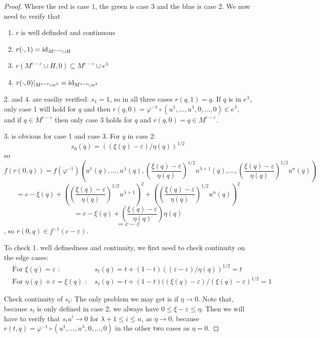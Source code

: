 \begin{proof}
   Where the red is case 1, the green is case 3 and the blue is case 2.
   We now need to verify that
   \begin{enumerate}
      \item $r$ is well definded and continuous 
      \item $r(\cdot, 1) = {\operatorname{id}}_{M^{c - \varepsilon} \cup H}$
      \item $r(M^{c - \varepsilon} \cup H, 0) 
         \subseteq M^{c - \varepsilon} \cup e^{\lambda}$
      \item $r(\cdot, 0)|_{M^{c - \varepsilon} \cup e^{\lambda}} 
         = {\operatorname{id}}_{M^{c - \varepsilon} \cup e^{\lambda}}$
   \end{enumerate}

   2. and 4. are easiliy verified:
   $s_1 = 1$, so in all three cases $r(q, 1) = q$. If $q$ is in $e^{\lambda}$,
   only case 1 will hold for $q$ and then 
   $r(q, 0) = \varphi^{-1} \circ (u^1, ..., u^{\lambda}, 0, ..., 0) \in e^{\lambda}$,
   and if $q \in M^{c - \varepsilon}$ then only case 3 holds for $q$ and 
   $r(q, 0) = q \in M^{c - \varepsilon}$.

   3. is obvious for case 1 and case 3. For $q$ in case 2:
   \[ s_0(q) = ((\xi(q) - \varepsilon)/\eta(q))^{1/2} \]
   so
   \[
      f(r(0, q)) = 
         f(\varphi^{-1})(u^1(q), ... , u^{\lambda}(q), 
            \left( \frac{\xi(q) - \varepsilon}{\eta(q)} \right)^{1/2} u^{\lambda + 1}(q), ... , 
            \left( \frac{\xi(q) - \varepsilon}{\eta(q)} \right)^{1/2} u^n(q)) 
   \]
   \[
      = c - \xi(q) + \left( \left( \frac{\xi(q) - \varepsilon}{\eta(q)} \right)^{1/2} u^{\lambda + 1} \right)^2
         + \left( \left( \frac{\xi(q) - \varepsilon}{\eta(q)} \right)^{1/2} u^n(q) \right)^2
   \]
   \[ = c - \xi(q) + \left( \frac{\xi(q) - \varepsilon}{\eta(q)} \right)\eta(q) \]
   \[ = c - \varepsilon \]
   , so $r(0, q) \in f^{-1}(c - \varepsilon)$.

   To check 1. well definedness and continuity, we first need to check 
   continuity on the edge cases: 
   \begin{align*}
      & \text{For } \xi(q) = \varepsilon \text{ : } 
         & s_t(q) = t + (1 - t)((\varepsilon - \varepsilon)/\eta(q))^{1/2} = t \\
      & \text{For } \eta(q) + \varepsilon = \xi(q) \text{ : }
         & s_t(q) = t + (1 - t)((\xi(q) - \varepsilon)/(\xi(q) - \varepsilon)^{1/2} 
         = 1
   \end{align*}

   Check continuity of $s_t$:
   The only problem we may get is if $\eta \rightarrow 0$. Note that, because 
   $s_t$ is only defined in case 2, we always have $0 \leq \xi - \varepsilon \leq \eta$. 
   Then we will have to verify that $s_tu^i \rightarrow 0$ for $\lambda + 1 \leq i \leq n$,
   as $\eta \rightarrow 0$, because 
   $r(t, q) = \varphi^{-1} \circ (u^1, ..., u^{\lambda}, 0, ..., 0)$ in the other
   two cases as $\eta = 0$.
   

\end{proof}
